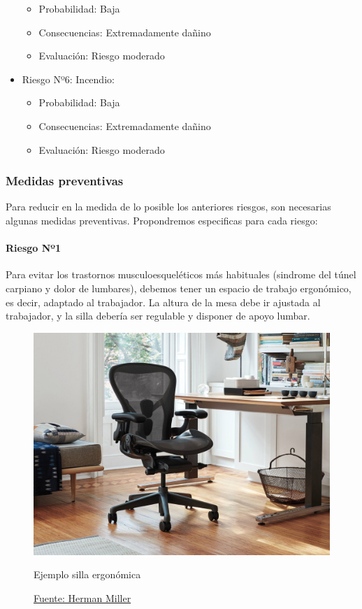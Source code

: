 \begin{itemize}
\begin{itemize}
            \item Probabilidad: Baja
            \item Consecuencias: Extremadamente dañino
            \item Evaluación: Riesgo moderado
        \end{itemize}
    \item Riesgo Nº6: Incendio: \begin{itemize}
              \item Probabilidad: Baja
              \item Consecuencias: Extremadamente dañino
              \item Evaluación: Riesgo moderado
          \end{itemize}
\end{itemize}

\subsubsection{Medidas preventivas}
Para reducir en la medida de lo posible los anteriores riesgos, son necesarias algunas medidas preventivas.
Propondremos especificas para cada riesgo:\\
\paragraph*{Riesgo Nº1}
Para evitar los trastornos musculoesqueléticos más habituales (sindrome del túnel carpiano y dolor de lumbares), debemos
tener un espacio de trabajo ergonómico, es decir, adaptado al trabajador. La altura de la mesa debe ir ajustada al trabajador, y la
silla debería ser regulable y disponer de apoyo lumbar.
\begin{figure}[H]
    \centering
    \includegraphics[width=1.0\textwidth]{Fol/silla.jpg}
    \caption{Ejemplo silla ergonómica}
    \caption*{\href{https://www.hermanmiller.com/es_mx/products/seating/office-chairs/aeron-chairs/}{Fuente: Herman Miller}}
\end{figure}

